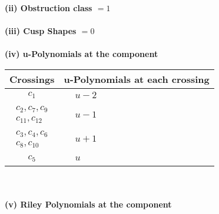 \documentclass[1p]{elsarticle_modified}
\theoremstyle{definition}
\begin{document}
\flushleft \textbf{(ii) Obstruction class $= 1$}\\~\\
\flushleft \textbf{(iii) Cusp Shapes $= 0$}\\~\\
\newpage\renewcommand{\arraystretch}{1}
\flushleft \textbf{(iv) u-Polynomials at the component}\newline \\
\begin{tabular}{m{50pt}|m{274pt}}
Crossings & \hspace{64pt}u-Polynomials at each crossing \\
\hline $$\begin{aligned}c_{1}\end{aligned}$$&$\begin{aligned}
&u-2
\end{aligned}$\\
\hline $$\begin{aligned}c_{2},c_{7},c_{9}\\c_{11},c_{12}\end{aligned}$$&$\begin{aligned}
&u-1
\end{aligned}$\\
\hline $$\begin{aligned}c_{3},c_{4},c_{6}\\c_{8},c_{10}\end{aligned}$$&$\begin{aligned}
&u+1
\end{aligned}$\\
\hline $$\begin{aligned}c_{5}\end{aligned}$$&$\begin{aligned}
&u
\end{aligned}$\\
\hline
\end{tabular}\\~\\
\newpage\renewcommand{\arraystretch}{1}
\flushleft \textbf{(v) Riley Polynomials at the component}\newline \\
\end{document}
